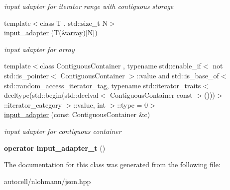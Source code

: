 \begin{DoxyCompactItemize}
\begin{DoxyCompactList}\small\item\em input adapter for iterator range with contiguous storage \end{DoxyCompactList}\item 
\mbox{\label{classnlohmann_1_1detail_1_1input__adapter_aa2392138bf8307df1994dc7eb22d51ce}} 
{\footnotesize template$<$class T , std\+::size\+\_\+t N$>$ }\\\mbox{\hyperlink{classnlohmann_1_1detail_1_1input__adapter_aa2392138bf8307df1994dc7eb22d51ce}{input\+\_\+adapter}} (T(\&\mbox{\hyperlink{namespacenlohmann_1_1detail_a1ed8fc6239da25abcaf681d30ace4985af1f713c9e000f5d3f280adbd124df4f5}{array}})\mbox{[}N\mbox{]})
\begin{DoxyCompactList}\small\item\em input adapter for array \end{DoxyCompactList}\item 
\mbox{\label{classnlohmann_1_1detail_1_1input__adapter_a6f92fe82cb49a508dbfb297c5630cc7f}} 
{\footnotesize template$<$class Contiguous\+Container , typename std\+::enable\+\_\+if$<$ not std\+::is\+\_\+pointer$<$ Contiguous\+Container $>$\+::value and std\+::is\+\_\+base\+\_\+of$<$ std\+::random\+\_\+access\+\_\+iterator\+\_\+tag, typename std\+::iterator\+\_\+traits$<$ decltype(std\+::begin(std\+::declval$<$ Contiguous\+Container const $>$()))$>$\+::iterator\+\_\+category $>$\+::value, int $>$\+::type  = 0$>$ }\\\mbox{\hyperlink{classnlohmann_1_1detail_1_1input__adapter_a6f92fe82cb49a508dbfb297c5630cc7f}{input\+\_\+adapter}} (const Contiguous\+Container \&c)
\begin{DoxyCompactList}\small\item\em input adapter for contiguous container \end{DoxyCompactList}\item 
\mbox{\label{classnlohmann_1_1detail_1_1input__adapter_a4ef04b9490247fc38f3d1c2a9e18789b}} 
{\bfseries operator input\+\_\+adapter\+\_\+t} ()
\end{DoxyCompactItemize}


The documentation for this class was generated from the following file\+:\begin{DoxyCompactItemize}
\item 
autocell/nlohmann/json.\+hpp\end{DoxyCompactItemize}
